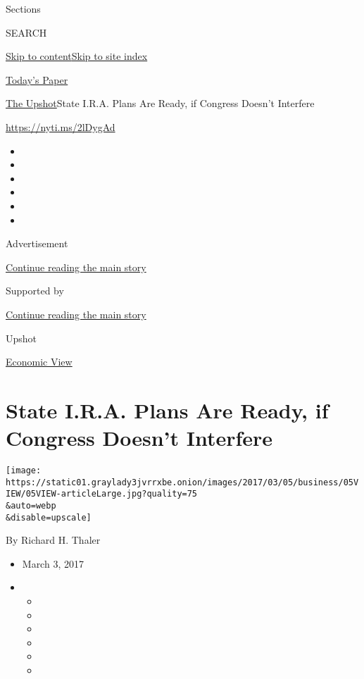 Sections

SEARCH

\protect\hyperlink{site-content}{Skip to
content}\protect\hyperlink{site-index}{Skip to site index}

\href{https://myaccount.nytimes3xbfgragh.onion/auth/login?response_type=cookie\&client_id=vi}{}

\href{https://www.nytimes3xbfgragh.onion/section/todayspaper}{Today's
Paper}

\href{/section/upshot}{The Upshot}\textbar{}State I.R.A. Plans Are
Ready, if Congress Doesn't Interfere

\url{https://nyti.ms/2lDygAd}

\begin{itemize}
\item
\item
\item
\item
\item
\item
\end{itemize}

Advertisement

\protect\hyperlink{after-top}{Continue reading the main story}

Supported by

\protect\hyperlink{after-sponsor}{Continue reading the main story}

Upshot

\href{/column/economic-view}{Economic View}

\hypertarget{state-ira-plans-are-ready-if-congress-doesnt-interfere}{%
\section{State I.R.A. Plans Are Ready, if Congress Doesn't
Interfere}\label{state-ira-plans-are-ready-if-congress-doesnt-interfere}}

\texttt{[image: https://static01.graylady3jvrrxbe.onion/images/2017/03/05/business/05VIEW/05VIEW-articleLarge.jpg?quality=75\\\&auto=webp\\\&disable=upscale]}

By Richard H. Thaler

\begin{itemize}
\item
  March 3, 2017
\item
  \begin{itemize}
  \item
  \item
  \item
  \item
  \item
  \item
  \end{itemize}
\end{itemize}

